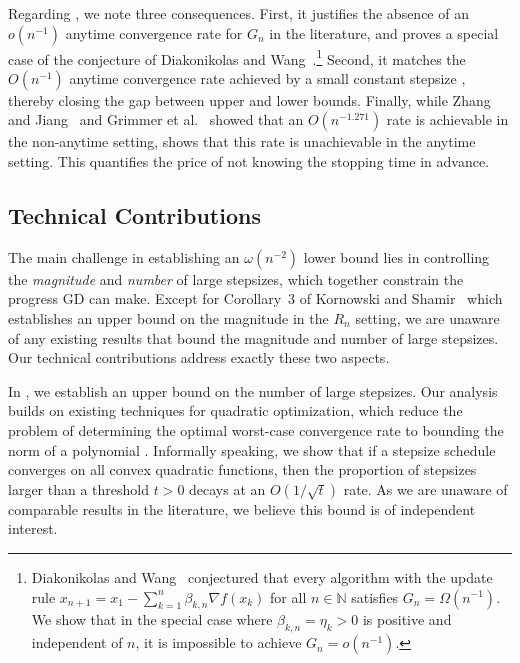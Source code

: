 \documentclass[11pt]{article}
\newcommand{\N}{\mathbb{N}}
\begin{document}
Regarding , we note three consequences.
First, it justifies the absence of an $o(n^{-1})$ anytime convergence rate for $G_n$ in the literature, and proves a special case of the conjecture of Diakonikolas and Wang~\cite{diakonikolas:2022}.\footnote{Diakonikolas and Wang~\cite{diakonikolas:2022} conjectured that every algorithm with the update rule $x_{n+1} = x_1 - \sum_{k=1}^n \beta_{k,n}\nabla f(x_k)$ for all $n\in\N$ satisfies $G_n=\Omega(n^{-1})$.
We show that in the special case where $\beta_{k,n}=\eta_k>0$ is positive and independent of $n$, it is impossible to achieve $G_n=o(n^{-1})$.}
Second, it matches the $O(n^{-1})$ anytime convergence rate achieved by a small constant stepsize \cite{rotaru:2026,taylor:2018}, thereby closing the gap between upper and lower bounds.
Finally, while Zhang and Jiang~\cite{zhang:2024} and Grimmer et al.~\cite{grimmer:2025a} showed that an $O(n^{-1.271})$ rate is achievable in the non-anytime setting,  shows that this rate is unachievable in the anytime setting.
This quantifies the price of not knowing the stopping time in advance.


\subsection{Technical Contributions}
The main challenge in establishing an $\omega(n^{-2})$ lower bound lies in controlling the \emph{magnitude} and \emph{number} of large stepsizes, which together constrain the progress GD can make.
Except for Corollary~3 of Kornowski and Shamir~\cite{kornowski:2024} which establishes an upper bound on the magnitude in the $R_n$ setting, we are unaware of any existing results that bound the magnitude and number of large stepsizes.
Our technical contributions address exactly these two aspects.


In , we establish an upper bound on the number of large stepsizes.
Our analysis builds on existing techniques for quadratic optimization, which reduce the problem of determining the optimal worst-case convergence rate to bounding the norm of a polynomial \cite{daspremont:2021,nemirovsky:1992,young:1953}.
Informally speaking, we show that if a stepsize schedule converges on all convex quadratic functions, then the proportion of stepsizes larger than a threshold $t>0$ decays at an $O(1/\sqrt{t})$ rate.
As we are unaware of comparable results in the literature, we believe this bound is of independent interest.
\end{document}
